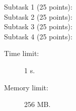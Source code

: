 \documentclass{boi2014}
\begin{document}
    \Example

    \Scoring

    \begin{description}
        \item[Subtask 1 (25 points):]
        \item[Subtask 2 (25 points):]
        \item[Subtask 3 (25 points):]
        \item[Subtask 4 (25 points):]
    \end{description}

    \Constraints

    \begin{description}
        \item[Time limit:] 1 s.
        \item[Memory limit:] 256 MB.
    \end{description}

\end{document}

